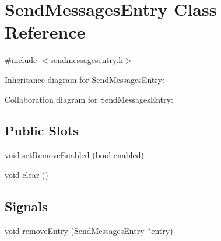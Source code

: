 \hypertarget{class_send_messages_entry}{}\section{Send\+Messages\+Entry Class Reference}
\label{class_send_messages_entry}


{\ttfamily \#include $<$sendmessagesentry.\+h$>$}



Inheritance diagram for Send\+Messages\+Entry\+:


Collaboration diagram for Send\+Messages\+Entry\+:
\subsection*{Public Slots}
\begin{DoxyCompactItemize}
\item 
void \hyperlink{class_send_messages_entry_a423c43c6473c007bb8caebd724391949}{set\+Remove\+Enabled} (bool enabled)
\item 
void \hyperlink{class_send_messages_entry_a98871865c8a13f83c15b9107ea65d249}{clear} ()
\end{DoxyCompactItemize}
\subsection*{Signals}
\begin{DoxyCompactItemize}
\item 
void \hyperlink{class_send_messages_entry_a878874b6e07b775060a8e4918c1d9952}{remove\+Entry} (\hyperlink{class_send_messages_entry}{Send\+Messages\+Entry} $\ast$entry)
\end{DoxyCompactItemize}
